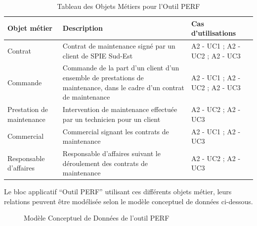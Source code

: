 \begin{table}[H]
    \begin{tabular}{p{3cm}|p{10cm}|p{3cm}}
    Objet métier & Description & Cas d'utilisations \\ \hline
    Contrat & Contrat de maintenance signé par un client de SPIE Sud-Est & A2 - UC1 ; A2 - UC2 ; A2 - UC3 \\ \hline
    Commande & Commande de la part d’un client d’un ensemble de prestations de maintenance, dans le cadre d’un contrat de maintenance & A2 - UC1 ; A2 - UC2 ; A2 - UC3 \\ \hline
    Prestation de maintenance & Intervention de maintenance effectuée par un technicien pour un client
 & A2 - UC2 ; A2 - UC3 \\ \hline
    Commercial & Commercial signant les contrats de maintenance & A2 - UC1 ; A2 - UC3 \\ \hline
    Responsable d’affaires & Responsable d’affaires suivant le déroulement des contrats de maintenance & A2 - UC2 ; A2 - UC3 \\ 
    \end{tabular}
    \caption{Tableau des Objets Métiers pour l'Outil PERF}
\end{table}

Le bloc applicatif “Outil PERF” utilisant ces différents objets métier, leurs relations peuvent être modélisée selon le modèle conceptuel de données ci-dessous.

\begin{figure}[H]
    \label{fig-om-perf}
    \noindent{}
    \caption{Modèle Conceptuel de Données de l'outil PERF}
\end{figure}

